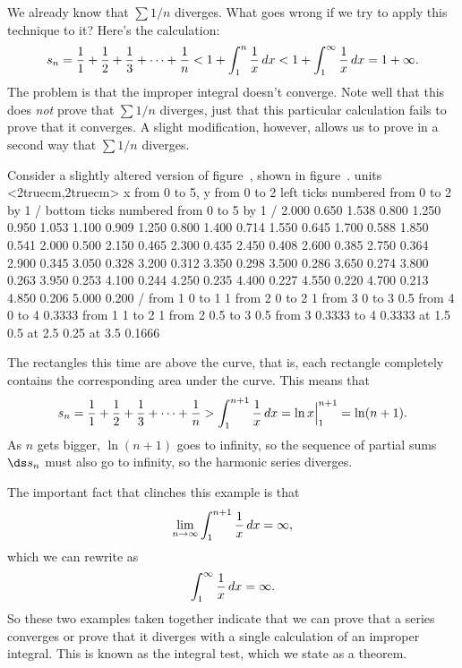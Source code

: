 We already know that $\sum 1/n$ diverges. What goes wrong if we try to
apply this technique to it? Here's the calculation:
$$
  s_n={1\over 1}+{1\over 2}+{1\over 3}+\cdots+{1\over n}
  < 1 + \int_1^n {1\over x}\,dx < 1+\int_1^\infty {1\over x}\,dx 
  =1+\infty.
$$
The problem is that the improper integral doesn't converge. Note well
that this does {\em not\/} prove that $\sum 1/n$ diverges, just that
this particular calculation fails to prove that it converges. A slight
modification, however, allows us to prove in a second way that $\sum
1/n$ diverges. 

\begin{example} Consider a slightly altered version of figure~, shown in figure~.
\figure
\vbox{\beginpicture
\normalgraphs
\ninepoint
\setcoordinatesystem units <2truecm,2truecm>
\setplotarea x from 0 to 5, y from 0 to 2
\axis left ticks numbered from 0 to 2 by 1 /
\axis bottom  ticks numbered from 0 to 5 by 1 /
\setquadratic
{} 2.000 0.650 1.538 0.800 1.250 0.950 1.053 1.100 0.909 
1.250 0.800 1.400 0.714 1.550 0.645 1.700 0.588 1.850 0.541 
2.000 0.500 2.150 0.465 2.300 0.435 2.450 0.408 2.600 0.385 
2.750 0.364 2.900 0.345 3.050 0.328 3.200 0.312 3.350 0.298 
3.500 0.286 3.650 0.274 3.800 0.263 3.950 0.253 4.100 0.244 
4.250 0.235 4.400 0.227 4.550 0.220 4.700 0.213 4.850 0.206 
5.000 0.200 /
\putrule from 1 0 to 1 1 
\putrule from 2 0 to 2 1
\putrule from 3 0 to 3 0.5
\putrule from 4 0 to 4 0.3333
\putrule from 1 1 to 2 1
\putrule from 2 0.5 to 3 0.5
\putrule from 3 0.3333 to 4 0.3333
\sevenpoint
{} at 1.5 0.5
 at 2.5 0.25
 at 3.5 0.1666
\endpicture}

The rectangles this time are above the curve, that is, each rectangle
completely contains the corresponding area under the curve. This means
that 
$$s_n = {1\over 1}+{1\over 2}+{1\over 3}+\cdots+{1\over n}
> \int_1^{n+1} {1\over x}\,dx = \ln x\Big|_1^{n+1}=\ln(n+1).$$
As $n$ gets bigger, $\ln(n+1)$ goes to infinity, so the sequence of
partial sums $\ds s_n$ must also go to infinity, so the harmonic series
diverges. 
\end{example}

The important fact that clinches this example is that
$$\lim_{n\to\infty} \int_1^{n+1} {1\over x}\,dx = \infty,$$
which we can rewrite as
$$\int_1^\infty {1\over x}\,dx = \infty.$$
So these two examples taken together indicate that we can prove that a
series converges or prove that it diverges with a single calculation
of an improper integral. This is known as the {\dfont integral
  test\/}, 
which we state as a theorem.


